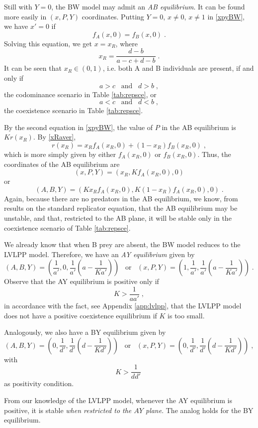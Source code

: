 \documentclass[12pt]{article}
\theoremstyle{definition}
\begin{document}
Still with $Y=0$, the BW model may admit an \emph{AB equilibrium}. It can be found more easily in $(x,P,Y)$ coordinates. Putting $Y=0$, $x \neq 0$, $x \neq 1$ in \eqref{xpyBW}, we have $x'=0$ if 
\[f_A(x,0)=f_B(x,0)\;.\]
Solving this equation, we get $x=x_R$, where
\begin{equation}  \label{defxR}
	x_R= \frac{d-b}{a-c+d-b}\;.
\end{equation}
It can be seen that $x_R \in(0,1)$, i.e. both A and B individuals are present, if and only if 
\[a>c  \;\;\; \mathrm{and} \;\;\; d>b\;,\]
the codominance scenario in Table \ref{tab:repsce}, or
\[a<c  \;\;\; \mathrm{and} \;\;\; d<b\;,\]
the coexistence scenario in Table \ref{tab:repsce}.

By the second equation in \eqref{xpyBW}, the value of $P$ in the AB equilibrium is $Kr(x_R)$. By \eqref{xRaver},
\[r(x_R)= x_R f_A(x_R,0)+(1-x_R) f_B(x_R,0)\;,\]
which is more simply given by either $f_A(x_R,0)$ or $f_B(x_R,0)$. Thus, the coordinates of the AB equilibrium are
\[(x,P,Y)=(x_R,K f_A(x_R,0),0)\] or
\[(A,B,Y)=(K x_R f_A(x_R,0),K (1-x_R) f_A(x_R,0),0)\;.\]
Again, because there are no predators in the AB equilibrium, we know, from results on the standard replicator equation, that the AB equilibrium may be unstable, and that, restricted to the AB plane, it will be stable only in the coexistence scenario of Table \ref{tab:repsce}. 

We already know that when B prey are absent, the BW model reduces to the LVLPP model. Therefore, we have an \emph{AY equilibrium} given by
\[(A,B,Y)= (\frac{1}{a'}, 0, \frac{1}{a'}(a- \frac{1}{Ka'}))\;\;\;\mathrm{or}\;\;\; (x,P,Y)= (1,\frac{1}{a'},  \frac{1}{a'}(a- \frac{1}{Ka'}))\;. \]
Observe that the AY equilibrium is positive only if
\begin{equation} \label{posAY}
	K > \frac{1}{a a'}\;,
\end{equation}
in accordance with the fact, see Appendix \ref{app:lvlpp}, that the LVLPP model does not have a positive coexistence equilibrium if $K$ is too small.

Analogously, we also have a BY equilibrium given by
\[(A,B,Y)= (0,\frac{1}{d'}, \frac{1}{d'}(d- \frac{1}{Kd'}))\;\;\;\mathrm{or}\;\;\; (x,P,Y)= (0,\frac{1}{d'},  \frac{1}{d'}(d- \frac{1}{Kd'}))\;, \]
with
\begin{equation} \label{posBY}
	K > \frac{1}{d d'}\;
\end{equation}
as positivity condition.

From our knowledge of the LVLPP model, whenever the AY equilibrium is positive, it is stable \emph{when restricted to the $AY$ plane}. The analog holds for the BY equilibrium.
\end{document}
